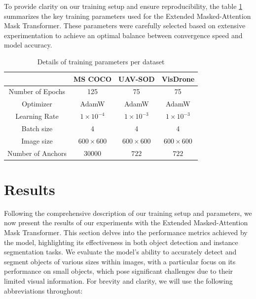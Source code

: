 To provide clarity on our training setup and ensure reproducibility, the table \ref{tab:training_parameters} summarizes the key training parameters used for the 
Extended Masked-Attention Mask Transformer. These parameters were carefully selected based on extensive experimentation to achieve an optimal balance between 
convergence speed and model accuracy. 
\begin{table}[h]
\centering
\begin{tabular}{|c|c|c|c|}
    \hline
    &                   \textbf{MS COCO}      & \textbf{UAV-SOD}     & \textbf{VisDrone}            \\ \hline
    Number of Epochs   & 125                  & 75                   & 75                           \\ \hline
    Optimizer          & AdamW                & AdamW                & AdamW                        \\ \hline
    Learning Rate      & $1 \times 10^{-4}$   & $1 \times 10^{-3}$   & $1 \times 10^{-3}$           \\ \hline
    Batch size         & 4                    &  4                   & 4                            \\ \hline
    Image size         & $600\times600$       &  $600\times600$      & $600\times600$               \\ \hline
    Number of Anchors  & $30000$              &  $722$               & $722$                        \\ \hline
\end{tabular}
\caption{Details of training parameters per dataset}
\label{tab:training_parameters}
\end{table}



\newpage

\section{Results}

Following the comprehensive description of our training setup and parameters, we now present the results of our experiments with the Extended Masked-Attention 
Mask Transformer. This section delves into the performance metrics achieved by the model, highlighting its effectiveness in both object detection and instance 
segmentation tasks. We evaluate the model's ability to accurately detect and segment objects of various sizes within images, with a particular focus on its 
performance on small objects, which pose significant challenges due to their limited visual information. For brevity and clarity, we will use the following 
abbreviations throughout:

